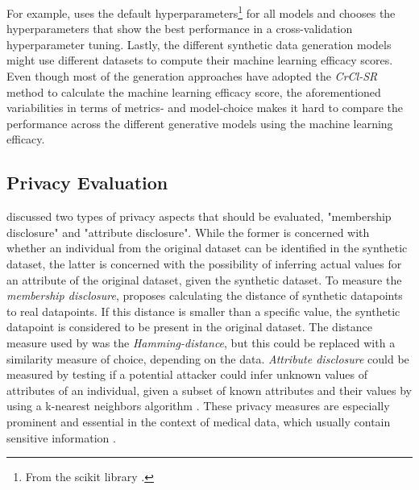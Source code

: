 For example, \cite{kunar2021DTGANDifferentialPrivatea} uses the default hyperparameters\footnote{From the scikit library \cite{scikit-learn}.} for all models and 
\cite{kim2021OCTGANNeuralODEbased} chooses the hyperparameters that show the best performance in a cross-validation hyperparameter tuning.
Lastly, the different synthetic data generation models might use different datasets to compute their machine learning efficacy scores.
Even though most of the generation approaches have adopted the \textit{CrCl-SR} \cite{goncalves2020GenerationEvaluationSynthetic} method to calculate the machine learning efficacy score,
the aforementioned variabilities in terms of metrics- and \gls{model}-choice makes it hard to compare the performance across the different generative models using the machine learning efficacy.

\subsection{Privacy Evaluation}
\label{ch:preliminaries-evaluationOfSyntheticTabularData-privacyEvaluation}
\textcite[p. 7f.]{goncalves2020GenerationEvaluationSynthetic} discussed two types of privacy aspects that should be evaluated, "membership disclosure" and "attribute disclosure".
While the former is concerned with whether an individual from the original dataset can be identified in the synthetic dataset, the latter is concerned with the possibility of inferring actual values for an attribute of the original dataset, given the synthetic dataset.
To measure the \textit{membership disclosure}, \cite{goncalves2020GenerationEvaluationSynthetic} proposes calculating the distance of synthetic datapoints to real datapoints.
If this distance is smaller than a specific value, the synthetic datapoint is considered to be present in the original dataset.
The distance measure used by \textcite{goncalves2020GenerationEvaluationSynthetic} was the \textit{Hamming-distance}, but this could be replaced with a similarity measure of choice, depending on the data.
\textit{Attribute disclosure} could be measured by testing if a potential attacker could infer unknown values of attributes of an individual, given a subset of known attributes and their values by using a k-nearest neighbors algorithm \cite{goncalves2020GenerationEvaluationSynthetic}.
These privacy measures are especially prominent and essential in the context of medical data, which usually contain sensitive information \cite{goncalves2020GenerationEvaluationSynthetic, choi2017GeneratingMultilabelDiscrete}.

